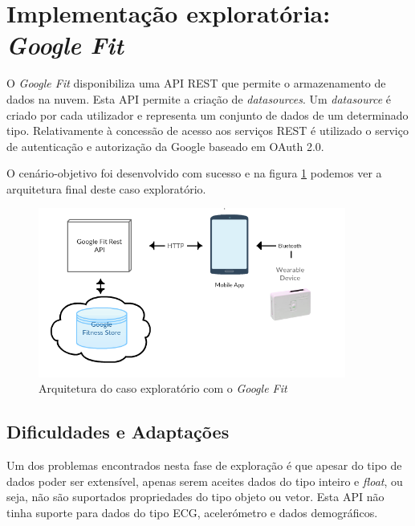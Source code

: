 \section{Implementação exploratória: \textit{Google Fit}}

O \textit{Google Fit} disponibiliza uma \gls{API} \gls{REST} que permite o armazenamento de dados na nuvem. Esta \gls{API} permite a criação  de \textit{datasources}. Um \textit{datasource} é criado por cada utilizador e representa  um conjunto de dados de um determinado tipo. Relativamente à concessão de acesso aos serviços \gls{REST} é utilizado o serviço de autenticação e autorização da Google baseado em OAuth 2.0. 
\par
O cenário-objetivo foi desenvolvido com sucesso e na figura \ref{f:exp-googlefit-arch} podemos ver a arquitetura final deste caso exploratório.
\begin{figure}[H]
  \centering
  \includegraphics[width=0.9\textwidth]{imgs/googlefit-arch-exp.png}
  \caption[Arquitetura do caso exploratório com o \textit{Google Fit}]{Arquitetura do caso exploratório com o \textit{Google Fit}}
  
  \label{f:exp-googlefit-arch}
\end{figure}

\subsection{Dificuldades e Adaptações}

Um dos problemas encontrados nesta fase de exploração é que apesar do tipo de dados poder ser extensível, apenas serem aceites dados do tipo inteiro e \textit{float}, ou seja, não são suportados propriedades do tipo objeto ou vetor. Esta \gls{API} não tinha suporte para dados do tipo \gls{ECG}, acelerómetro e dados demográficos.

